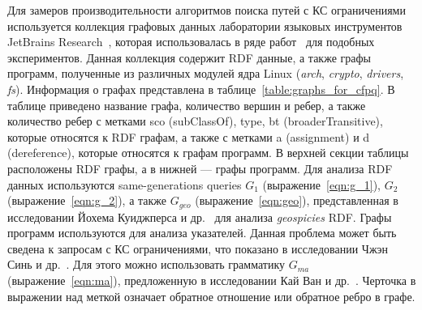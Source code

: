 Для замеров производительности алгоритмов поиска путей с КС ограничениями используется коллекция графовых данных лаборатории языковых инструментов JetBrains Research~\cite{net:cfpq_data}, которая использовалась в ряде работ~\cite{inproceedings:matrix_cfpq, inproceedings:cfpq_matrix_evaluation, inbook:kronecker_cfpq_adbis, inproceedings:cfqp_matrix_with_single_source} для подобных экспериментов. 
Данная коллекция содержит RDF данные, а также графы программ, полученные из различных модулей ядра Linux (\textit{arch}, \textit{crypto}, \textit{drivers}, \textit{fs}). 
Информация о графах представлена в таблице~\ref{table:graphs_for_cfpq}. 
В таблице приведено название графа, количество вершин и ребер, а также количество ребер с метками sco (subClassOf), type, bt (broaderTransitive), которые относятся к RDF графам, а также с метками a (assignment) и d (dereference), которые относятся к графам программ. В верхней секции таблицы расположены RDF графы, а в нижней --- графы программ. 
Для анализа RDF данных используются same-generations queries $G_1$ (выражение~\ref{eqn:g_1}), $G_2$ (выражение~\ref{eqn:g_2}), а также $G_{geo}$ (выражение~\ref{eqn:geo}), представленная в исследовании Йохема Куиджперса и др.~\cite{article:kuijpers_cfpq_exp_compare} для анализа \textit{geospicies} RDF. 
Графы программ используются для анализа указателей. 
Данная проблема может быть сведена к запросам с КС ограничениями, что показано в исследовании Чжэн Синь и др.~\cite{Zheng:2008:DAA:1328897.1328464}. Для этого можно использовать грамматику $G_{ma}$ (выражение~\ref{eqn:ma}), предложенную в исследовании Кай Ван и др.~\cite{10.1145/3093336.3037744}. Черточка в выражении над меткой означает обратное отношение или обратное ребро в графе. 

